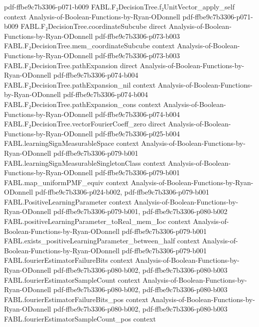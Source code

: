 \begin{theorem}
  {pdf-ffbe9c7b3306-p071-b009}
\proofstep
  {FABL.F₂DecisionTree.f₂UnitVector_apply_self}
  {context}
  {Analysis-of-Boolean-Functions-by-Ryan-ODonnell}
  {pdf-ffbe9c7b3306-p071-b009}
\proofstep
  {FABL.F₂DecisionTree.coordinateSubcube}
  {direct}
  {Analysis-of-Boolean-Functions-by-Ryan-ODonnell}
  {pdf-ffbe9c7b3306-p073-b003}
\proofstep
  {FABL.F₂DecisionTree.mem_coordinateSubcube}
  {context}
  {Analysis-of-Boolean-Functions-by-Ryan-ODonnell}
  {pdf-ffbe9c7b3306-p073-b003}
\proofstep
  {FABL.F₂DecisionTree.pathExpansion}
  {direct}
  {Analysis-of-Boolean-Functions-by-Ryan-ODonnell}
  {pdf-ffbe9c7b3306-p074-b004}
\proofstep
  {FABL.F₂DecisionTree.pathExpansion_nil}
  {context}
  {Analysis-of-Boolean-Functions-by-Ryan-ODonnell}
  {pdf-ffbe9c7b3306-p074-b004}
\proofstep
  {FABL.F₂DecisionTree.pathExpansion_cons}
  {context}
  {Analysis-of-Boolean-Functions-by-Ryan-ODonnell}
  {pdf-ffbe9c7b3306-p074-b004}
\proofstep
  {FABL.F₂DecisionTree.vectorFourierCoeff_zero}
  {direct}
  {Analysis-of-Boolean-Functions-by-Ryan-ODonnell}
  {pdf-ffbe9c7b3306-p025-b004}
\proofstep
  {FABL.learningSignMeasurableSpace}
  {context}
  {Analysis-of-Boolean-Functions-by-Ryan-ODonnell}
  {pdf-ffbe9c7b3306-p079-b001}
\proofstep
  {FABL.learningSignMeasurableSingletonClass}
  {context}
  {Analysis-of-Boolean-Functions-by-Ryan-ODonnell}
  {pdf-ffbe9c7b3306-p079-b001}
\proofstep
  {FABL.map_uniformPMF_equiv}
  {context}
  {Analysis-of-Boolean-Functions-by-Ryan-ODonnell}
  {pdf-ffbe9c7b3306-p024-b002,
    pdf-ffbe9c7b3306-p079-b001}
\proofstep
  {FABL.PositiveLearningParameter}
  {context}
  {Analysis-of-Boolean-Functions-by-Ryan-ODonnell}
  {pdf-ffbe9c7b3306-p079-b001,
    pdf-ffbe9c7b3306-p080-b002}
\proofstep
  {FABL.positiveLearningParameter_toReal_mem_Ioc}
  {context}
  {Analysis-of-Boolean-Functions-by-Ryan-ODonnell}
  {pdf-ffbe9c7b3306-p079-b001}
\proofstep
  {FABL.exists_positiveLearningParameter_between_half}
  {context}
  {Analysis-of-Boolean-Functions-by-Ryan-ODonnell}
  {pdf-ffbe9c7b3306-p079-b001}
\proofstep
  {FABL.fourierEstimatorFailureBits}
  {context}
  {Analysis-of-Boolean-Functions-by-Ryan-ODonnell}
  {pdf-ffbe9c7b3306-p080-b002,
    pdf-ffbe9c7b3306-p080-b003}
\proofstep
  {FABL.fourierEstimatorSampleCount}
  {context}
  {Analysis-of-Boolean-Functions-by-Ryan-ODonnell}
  {pdf-ffbe9c7b3306-p080-b002,
    pdf-ffbe9c7b3306-p080-b003}
\proofstep
  {FABL.fourierEstimatorFailureBits_pos}
  {context}
  {Analysis-of-Boolean-Functions-by-Ryan-ODonnell}
  {pdf-ffbe9c7b3306-p080-b002,
    pdf-ffbe9c7b3306-p080-b003}
\proofstep
  {FABL.fourierEstimatorSampleCount_pos}
  {context}

\end{theorem}
